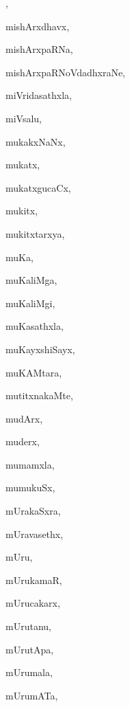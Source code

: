 \begin{multicols}{3}
{\noindent
{}, \pageref{misharxSaDusathxla, misharxliMgApaRNa}

\noindent
{mishArxdhavx}, \pageref{mishArxdhavx}

\noindent
{mishArxpaRNa}, \pageref{mishArxpaRNa}

\noindent
{mishArxpaRNoVdadhxraNe}, \pageref{mishArxpaRNoVdadhxraNe}

\noindent
{miVridasathxla}, \pageref{miVridasathxla}

\noindent
{miVsalu}, \pageref{miVsalu}

\noindent
{mukakxNaNx}, \pageref{mukakxNaNx}

\noindent
{mukatx}, \pageref{mukatx}

\noindent
{mukatxgucaCx}, \pageref{mukatxgucaCx}

\noindent
{mukitx}, \pageref{mukitx}

\noindent
{mukitxtarxya}, \pageref{mukitxtarxya}

\noindent
{muKa}, \pageref{muKa}

\noindent
{muKaliMga}, \pageref{muKaliMga}

\noindent
{muKaliMgi}, \pageref{muKaliMgi}

\noindent
{muKasathxla}, \pageref{muKasathxla}

\noindent
{muKayxshiSayx}, \pageref{muKayxshiSayx}

\noindent
{muKAMtara}, \pageref{muKAMtara}

\noindent
{mutitxnakaMte}, \pageref{mutitxnakaMte}

\noindent
{mudArx}, \pageref{mudArx}

\noindent
{muderx}, \pageref{muderx}

\noindent
{mumamxla}, \pageref{mumamxla}

\noindent
{mumukuSx}, \pageref{mumukuSx}

\noindent
{mUrakaSxra}, \pageref{mUrakaSxra}

\noindent
{mUravasethx}, \pageref{mUravasethx}

\noindent
{mUru}, \pageref{mUru}

\noindent
{mUrukamaR}, \pageref{mUrukamaR}

\noindent
{mUrucakarx}, \pageref{mUrucakarx}

\noindent
{mUrutanu}, \pageref{mUrutanu}

\noindent
{mUrutApa}, \pageref{mUrutApa}

\noindent
{mUrumala}, \pageref{mUrumala}

\noindent
{mUrumATa}, \pageref{mUrumATa}

}
\end{multicols}
